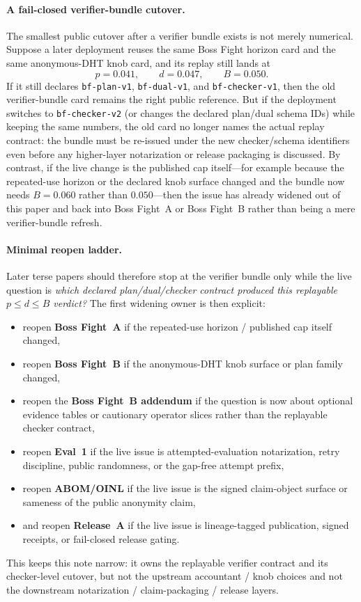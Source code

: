 \documentclass[11pt]{article}
\begin{document}
\paragraph{A fail-closed verifier-bundle cutover.}
The smallest public cutover after a verifier bundle exists is not merely numerical.
Suppose a later deployment reuses the same Boss Fight horizon card and the same anonymous-DHT knob card, and its replay still lands at
\[
p=0.041,\qquad d=0.047,\qquad B=0.050.
\]
If it still declares \texttt{bf-plan-v1}, \texttt{bf-dual-v1}, and \texttt{bf-checker-v1}, then the old verifier-bundle card remains the right public reference.
But if the deployment switches to \texttt{bf-checker-v2} (or changes the declared plan/dual schema IDs) while keeping the same numbers, the old card no longer names the actual replay contract: the bundle must be re-issued under the new checker/schema identifiers even before any higher-layer notarization or release packaging is discussed.
By contrast, if the live change is the published cap itself---for example because the repeated-use horizon or the declared knob surface changed and the bundle now needs $B=0.060$ rather than $0.050$---then the issue has already widened out of this paper and back into Boss Fight~A or Boss Fight~B rather than being a mere verifier-bundle refresh.\cite{series:bossfighta,series:bossfightb}

\paragraph{Minimal reopen ladder.}
Later terse papers should therefore stop at the verifier bundle only while the live question is \emph{which declared plan/dual/checker contract produced this replayable $p\le d\le B$ verdict?}
The first widening owner is then explicit:
\begin{itemize}[leftmargin=*]
\item reopen \textbf{Boss Fight~A} if the repeated-use horizon / published cap itself changed,\cite{series:bossfighta}
\item reopen \textbf{Boss Fight~B} if the anonymous-DHT knob surface or plan family changed,\cite{series:bossfightb}
\item reopen the \textbf{Boss Fight~B addendum} if the question is now about optional evidence tables or cautionary operator slices rather than the replayable checker contract,\cite{series:bossfightBaddendum}
\item reopen \textbf{Eval~1} if the live issue is attempted-evaluation notarization, retry discipline, public randomness, or the gap-free attempt prefix,\cite{series:evalnotary}
\item reopen \textbf{ABOM/OINL} if the live issue is the signed claim-object surface or sameness of the public anonymity claim,\cite{series:abomoinl}
\item and reopen \textbf{Release~A} if the live issue is lineage-tagged publication, signed receipts, or fail-closed release gating.\cite{series:releaseproperty}
\end{itemize}
This keeps this note narrow: it owns the replayable verifier contract and its checker-level cutover, but not the upstream accountant / knob choices and not the downstream notarization / claim-packaging / release layers.
\end{document}
